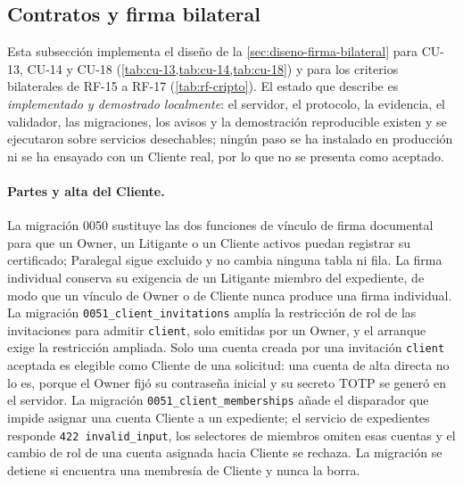 \subsection{Contratos y firma bilateral}
\label{sec:impl-firma-bilateral}

Esta subsección implementa el diseño de la \cref{sec:diseno-firma-bilateral}
para CU-13, CU-14 y CU-18 (\cref{tab:cu-13,tab:cu-14,tab:cu-18}) y para los
criterios bilaterales de RF-15 a RF-17 (\cref{tab:rf-cripto}). El estado que
describe es \emph{implementado y demostrado localmente}: el servidor, el
protocolo, la evidencia, el validador, las migraciones, los avisos y la
demostración reproducible existen y se ejecutaron sobre servicios desechables;
ningún paso se ha instalado en producción ni se ha ensayado con un Cliente
real, por lo que no se presenta como aceptado.

\paragraph{Partes y alta del Cliente.} La migración 0050 sustituye las dos
funciones de vínculo de firma documental para que un Owner, un Litigante o un
Cliente activos puedan registrar su certificado; Paralegal sigue excluido y no
cambia ninguna tabla ni fila. La firma individual conserva su exigencia de un
Litigante miembro del expediente, de modo que un vínculo de Owner o de Cliente
nunca produce una firma individual. La migración
\texttt{0051\_client\_invitations} amplía la restricción de rol de las
invitaciones para admitir \texttt{client}, solo emitidas por un Owner, y el
arranque exige la restricción ampliada. Solo una cuenta creada por una
invitación \texttt{client} aceptada es elegible como Cliente de una solicitud:
una cuenta de alta directa no lo es, porque el Owner fijó su contraseña
inicial y su secreto TOTP se generó en el servidor. La migración
\texttt{0051\_client\_memberships} añade el disparador que impide asignar una
cuenta Cliente a un expediente; el servicio de expedientes responde
\texttt{422 invalid\_input}, los selectores de miembros omiten esas cuentas y
el cambio de rol de una cuenta asignada hacia Cliente se rechaza. La migración
se detiene si encuentra una membresía de Cliente y nunca la borra.

